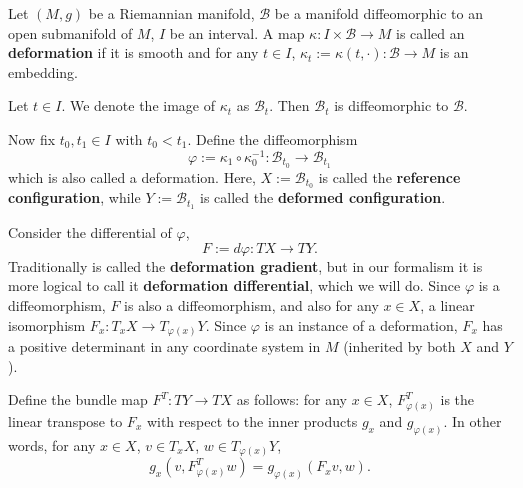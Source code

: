 \begin{discussion}
  Let
    $(M, g)$ be a Riemannian manifold,
    $\mathcal{B}$ be a manifold diffeomorphic to an open submanifold of $M$,
    $I$ be an interval.
  A map $\kappa \colon I \times \mathcal{B} \to M$
  is called an \textbf{deformation} if it is smooth and for any $t \in I$,
  $\kappa_t := \kappa(t, \cdot) \colon \mathcal{B} \to M$ is an embedding.
\end{discussion}
\begin{discussion}
  Let $t \in I$.
  We denote the image of $\kappa_t$ as $\mathcal{B}_t$.
  Then $\mathcal{B}_t$ is diffeomorphic to $\mathcal{B}$.
\end{discussion}
\begin{discussion}
  Now fix $t_0, t_1 \in I$ with $t_0 < t_1$.
  Define the diffeomorphism
  \begin{equation}
    \varphi
    := \kappa_1 \circ \kappa_0^{-1}
    \colon \mathcal{B}_{t_0} \to \mathcal{B}_{t_1}
  \end{equation}
  which is also called a deformation.
  Here, $X := \mathcal{B}_{t_0}$ is called the \textbf{reference configuration},
  while $Y := \mathcal{B}_{t_1}$ is called the \textbf{deformed configuration}.
\end{discussion}
\begin{discussion}
  Consider the differential of $\varphi$,
  \begin{equation}
    F := d \varphi \colon T X \to T Y.
  \end{equation}
  Traditionally is called the \textbf{deformation gradient},
  but in our formalism it is more logical to call it
  \textbf{deformation differential}, which we will do.
  Since $\varphi$ is a diffeomorphism, $F$ is also a diffeomorphism, and also
  for any $x \in X$, a linear isomorphism
  $F_x \colon T_x X \to T_{\varphi(x)} Y$.
  Since $\varphi$ is an instance of a deformation, $F_x$ has a positive
  determinant in any coordinate system in $M$ (inherited by both $X$ and $Y$).
\end{discussion}
\begin{discussion}
  Define the bundle map $F^T \colon T Y \to T X$ as follows:
  for any $x \in X$, $F^T_{\varphi(x)}$ is the linear transpose to $F_x$
  with respect to the inner products $g_x$ and $g_{\varphi(x)}$.
  In other words, for any $x \in X$, $v \in T_x X$, $w \in T_{\varphi(x)} Y$,
  \begin{equation}
    g_x(v, F^T_{\varphi(x)} w) = g_{\varphi(x)}(F_x v, w).
  \end{equation}
\end{discussion}
